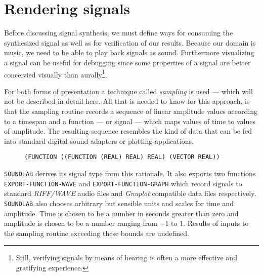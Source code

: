 \section{Rendering signals}

Before discussing signal synthesis, we must define ways for consuming the
synthesized signal as well as for verification of our results. Because
our domain is music, we need to be able to play back signals as sound.
Furthermore visualizing a signal can be useful for debugging since some
properties of a signal are better conceivied visually than
aurally\footnote{Still, verifying signals by means of hearing is often a
more effective and gratifying experience.}.

For both forms of presentation a technique called \textit{sampling} is
used --- which will not be described in detail here. All that is needed
to know for this approach, is that the sampling routine records a
sequence of linear amplitude values according to a timespan and a
function --- or signal --- which maps values of time to values of
amplitude. The resulting sequence resembles the kind of data that can be
fed into standard digital sound adapters or plotting applications.

\begin{figure}
\centering
\begin{verbatim}
(FUNCTION ((FUNCTION (REAL) REAL) REAL) (VECTOR REAL))
\end{verbatim}
\end{figure}

\texttt{SOUNDLAB} derives its signal type from this rationale. It also
exports two functions \texttt{EXPORT-FUNCTION-WAVE} and
\texttt{EXPORT-FUNCTION-GRAPH} which record signals to standard
\textit{RIFF/WAVE} audio files and \textit{Gnuplot} compatible data files
respectively. \texttt{SOUNDLAB} also chooses arbitrary but sensible units
and scales for time and amplitude. Time is chosen to be a number in
seconds greater than zero and amplitude is chosen to be a number ranging
from $-1$ to $1$. Results of inputs to the sampling routine exceeding
these bounds are undefined.
